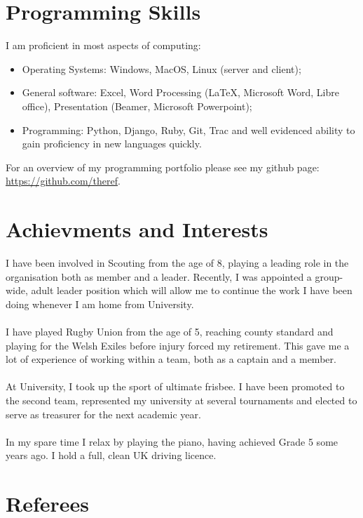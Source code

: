 \documentclass[a4paper]{article}
\begin{document}
\section{Programming Skills}
I am proficient in most aspects of computing:

\begin{itemize}
    \item Operating Systems: Windows, MacOS, Linux (server and client);
    \item General software: Excel, Word Processing (\LaTeX, Microsoft Word, Libre office), Presentation (Beamer, Microsoft Powerpoint);
    \item Programming: Python, Django, Ruby, Git, Trac and well evidenced ability to gain proficiency in new languages quickly.
\end{itemize}

For an overview of my programming portfolio please see my github page: \url{https://github.com/theref}.
\section{Achievments and Interests}
I have been involved in Scouting from the age of 8, playing a leading role in the organisation both as member and a leader.
Recently, I was appointed a group-wide, adult leader position which will allow me to continue the work I have been doing whenever I am home from University. \\
\\
I have played Rugby Union from the age of 5, reaching county standard and playing for the Welsh Exiles before injury forced my retirement.
This gave me a lot of experience of working within a team, both as a captain and a member. \\
\\
At University, I took up the sport of ultimate frisbee. I have been promoted to the second team, represented my university at several tournaments and elected to serve as treasurer for the next academic year. \\
\\
In my spare time I relax by playing the piano, having achieved Grade 5 some years ago. I hold a full, clean UK driving licence.
\section{Referees}
\end{document}
